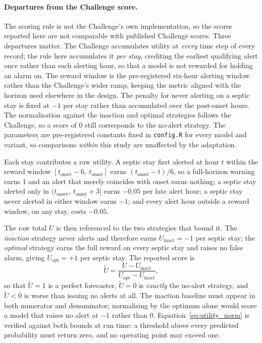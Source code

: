 \paragraph{Departures from the Challenge score.} The scoring rule is not the
Challenge's own implementation, so the scores reported here are not comparable
with published Challenge scores. Three departures matter. The Challenge
accumulates utility at \emph{every} time step of every record; the rule here
accumulates it \emph{per stay}, crediting the earliest qualifying alert once
rather than each alerting hour, so that a model is not rewarded for holding an
alarm on. The reward window is the pre-registered six-hour alerting window
rather than the Challenge's wider ramp, keeping the metric aligned with the
horizon used elsewhere in the design. The penalty for never alerting on a
septic stay is fixed at $-1$ per stay rather than accumulated over the
post-onset hours. The normalisation against the inaction and optimal strategies
follows the Challenge, so a score of 0 still corresponds to the no-alert
strategy. The parameters are pre-registered constants fixed in
\texttt{config.R} for every model and variant, so comparisons \emph{within}
this study are unaffected by the adaptation.

Each stay contributes a raw utility. A septic stay first alerted at hour $t$
within the reward window $[t_{\mathrm{onset}} - 6,\ t_{\mathrm{onset}}]$ earns
$(t_{\mathrm{onset}} - t)/6$, so a full-horizon warning earns 1 and an alert
that merely coincides with onset earns nothing; a septic stay alerted only in
$(t_{\mathrm{onset}},\ t_{\mathrm{onset}} + 3]$ earns $-0.05$ per late alert
hour; a septic stay never alerted in either window earns $-1$; and every alert
hour outside a reward window, on any stay, costs $-0.05$.

The raw total $U$ is then referenced to the two strategies that bound it. The
\emph{inaction} strategy never alerts and therefore earns $U_{\text{inact}} =
-1$ per septic stay; the \emph{optimal} strategy earns the full reward on every
septic stay and raises no false alarm, giving $U_{\text{opt}} = +1$ per septic
stay. The reported score is
\begin{equation}
    \widetilde{U} = \frac{U - U_{\text{inact}}}
                         {U_{\text{opt}} - U_{\text{inact}}},
    \label{eq:utility_norm}
\end{equation}
so that $\widetilde{U} = 1$ is a perfect forecaster, $\widetilde{U} = 0$ is
\emph{exactly} the no-alert strategy, and $\widetilde{U} < 0$ is worse than
issuing no alerts at all. The inaction baseline must appear in both numerator
and denominator; normalising by the optimum alone would score a model that
raises no alert at $-1$ rather than $0$. Equation~\eqref{eq:utility_norm} is
verified against both bounds at run time: a threshold above every predicted
probability must return zero, and no operating point may exceed one.

